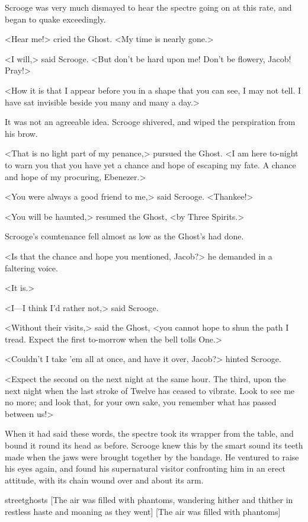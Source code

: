 Scrooge was very much dismayed to hear the spectre going on at this rate, and began to quake exceedingly.

<Hear me!> cried the Ghost. <My time is nearly gone.>

<I will,> said Scrooge. <But don't be hard upon me! Don't be flowery, Jacob! Pray!>

<How it is that I appear before you in a shape that you can see, I may not tell. I have sat invisible beside you many and many a day.>

It was not an agreeable idea. Scrooge shivered, and wiped the perspiration from his brow.

<That is no light part of my penance,> pursued the Ghost. <I am here to-night to warn you that you have yet a chance and hope of escaping my fate. A chance and hope of my procuring, Ebenezer.>

<You were always a good friend to me,> said Scrooge. <Thankee!>

<You will be haunted,> resumed the Ghost, <by Three Spirits.>

Scrooge's countenance fell almost as low as the Ghost's had done.

<Is that the chance and hope you mentioned, Jacob?> he demanded in a faltering voice.

<It is.>

<I—I think I'd rather not,> said Scrooge.

<Without their visits,> said the Ghost, <you cannot hope to shun the path I tread. Expect the first to-morrow when the bell tolls One.>

<Couldn't I take 'em all at once, and have it over, Jacob?> hinted Scrooge.

<Expect the second on the next night at the same hour. The third, upon the next night when the last stroke of Twelve has ceased to vibrate. Look to see me no more; and look that, for your own sake, you remember what has passed between us!>

When it had said these words, the spectre took its wrapper from the table, and bound it round its head as before. Scrooge knew this by the smart sound its teeth made when the jaws were brought together by the bandage. He ventured to raise his eyes again, and found his supernatural visitor confronting him in an erect attitude, with its chain wound over and about its arm.

\begin{colorbigpic}
	[\basicscale]
	{streetghosts}
	[The air was filled with phantoms, wandering hither and thither in restless haste and moaning as they went]
	[The air was filled with phantoms]
\end{colorbigpic}


